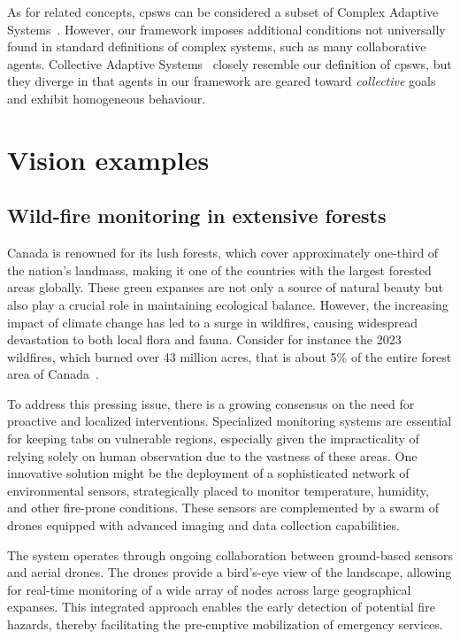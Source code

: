 As for related concepts, 
 \acp{cpsw} can be considered a subset of Complex Adaptive Systems~\cite{holland1992complex}. 
 However, our framework imposes additional conditions not universally found in standard definitions of complex systems, 
 such as many collaborative agents.
% 
Collective Adaptive Systems~\cite{DBLP:journals/corr/abs-1108-5643} closely resemble our definition of \acp{cpsw}, 
 but they diverge in that agents in our framework are geared toward \emph{collective} goals 
 and exhibit homogeneous behaviour.

\section{Vision examples}
\subsection{Wild-fire monitoring in extensive forests}
Canada is renowned for its lush forests, 
 which cover approximately one-third of the nation's landmass, 
 making it one of the countries with the largest forested areas globally. 
These green expanses are not only a source of natural beauty but also play a crucial role in maintaining ecological balance. 
 However, the increasing impact of climate change has led to a surge in wildfires, 
 causing widespread devastation to both local flora and fauna.
 Consider for instance the 2023 wildfires, 
 which burned over 43 million acres, 
 that is about 5\% of the entire forest area of Canada~\cite{enwiki:1178342069}. 

To address this pressing issue, 
 there is a growing consensus on the need for proactive and localized interventions. 
 Specialized monitoring systems are essential for keeping tabs on vulnerable regions, 
 especially given the impracticality of relying solely on human observation due to the vastness of these areas. 
 One innovative solution might be the deployment of a sophisticated network of environmental sensors, strategically placed to monitor temperature, humidity, and other fire-prone conditions. 
 These sensors are complemented by a swarm of drones equipped with advanced imaging and data collection capabilities.

The system operates through ongoing collaboration between ground-based sensors and aerial drones. 
 The drones provide a bird's-eye view of the landscape, 
 allowing for real-time monitoring of a wide array of nodes across large geographical expanses. 
 This integrated approach enables the early detection of potential fire hazards, 
 thereby facilitating the pre-emptive mobilization of emergency services.

